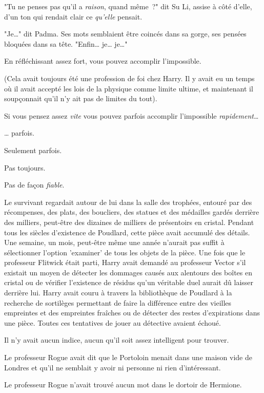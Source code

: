 "Tu ne penses pas qu'il a \emph{raison}, quand même~?" dit Su Li, assise à côté d'elle, d'un ton qui rendait clair ce \emph{qu'elle} pensait.

"Je…" dit Padma. Ses mots semblaient être coincés dans sa gorge, ses pensées bloquées dans sa tête. "Enfin… je… je…"

\later

En réfléchissant assez fort, vous pouvez accomplir l'impossible.

(Cela avait toujours été une profession de foi chez Harry. Il y avait eu un temps où il avait accepté les lois de la physique comme limite ultime, et maintenant il soupçonnait qu'il n'y ait pas de limites du tout).

Si vous pensez assez \emph{vite} vous pouvez parfois accomplir l'impossible \emph{rapidement}…

… parfois.

Seulement parfois.

Pas toujours.

Pas de façon \emph{fiable}.

Le survivant regardait autour de lui dans la salle des trophées, entouré par des récompenses, des plats, des boucliers, des statues et des médailles gardés derrière des milliers, peut-être des dizaines de milliers de présentoirs en cristal. Pendant tous les siècles d'existence de Poudlard, cette pièce avait accumulé des détails. Une semaine, un mois, peut-être même une année n'aurait pas suffit à sélectionner l'option 'examiner' de tous les objets de la pièce. Une fois que le professeur Flitwick était parti, Harry avait demandé au professeur Vector s'il existait un moyen de détecter les dommages causés aux alentours des boîtes en cristal ou de vérifier l'existence de résidus qu'un véritable duel aurait dû laisser derrière lui. Harry avait couru à travers la bibliothèque de Poudlard à la recherche de sortilèges permettant de faire la différence entre des vieilles empreintes et des empreintes fraîches ou de détecter des restes d'expirations dans une pièce. Toutes ces tentatives de jouer au détective avaient échoué.

Il n'y avait aucun indice, aucun qu'il soit assez intelligent pour trouver.

Le professeur Rogue avait dit que le Portoloin menait dans une maison vide de Londres et qu'il ne semblait y avoir ni personne ni rien d'intéressant.

Le professeur Rogue n'avait trouvé aucun mot dans le dortoir de Hermione.

